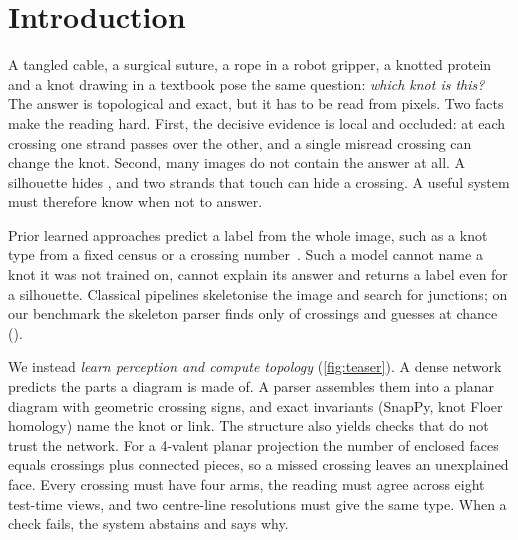 \section{Introduction}\label{sec:intro}

A tangled cable, a surgical suture, a rope in a robot gripper, a knotted protein~\cite{taylor2000knotted} and a knot drawing in a
textbook pose the same question: \emph{which knot is this?} The answer is
topological and exact, but it has to be read from pixels. Two facts make the reading
hard. First, the decisive evidence is local and occluded: at each crossing one
strand passes over the other, and a single misread crossing can change the knot.
Second, many images do not contain the answer at all. A silhouette hides \ou{}, and two
strands that touch can hide a crossing. A useful system must therefore know when
not to answer.

Prior learned approaches predict a label from the whole image, such as a knot type from a fixed census or a crossing number~\cite{kauffman2022rectangular,dranowski2025knotdetection}.
Such a model cannot name a knot it was not trained on, cannot explain its answer
and returns a label even for a silhouette. Classical pipelines skeletonise the image
and search for junctions; on our benchmark the skeleton parser finds only
\BaseRecall{} of crossings and guesses \ou{} at chance (\BaseOU).

We instead \emph{learn perception and compute topology} (\cref{fig:teaser}). A dense
network predicts the parts a diagram is made of. A parser
assembles them into a planar diagram with geometric crossing signs, and exact
invariants (SnapPy, knot Floer homology) name the knot or link. The structure also
yields checks that do not trust the network. For a 4-valent planar projection the
number of enclosed faces equals crossings plus connected pieces, so a missed
crossing leaves an unexplained face. Every crossing must have four arms, the
\ou{} reading must agree across eight test-time views, and two centre-line
resolutions must give the same type. When a check fails, the system abstains and says
why.

